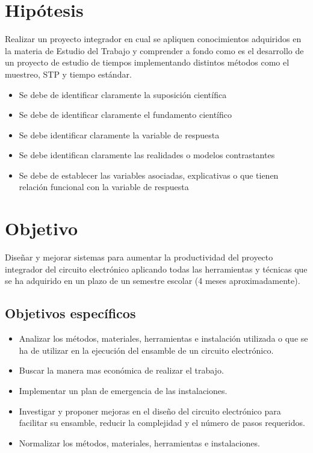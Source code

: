     
    \section{Hipótesis}
    
    Realizar un proyecto integrador en cual se apliquen conocimientos adquiridos en la materia de Estudio del Trabajo y comprender a fondo como es el desarrollo de un proyecto de estudio de tiempos implementando distintos métodos como el muestreo, STP y tiempo estándar.
    
    
    \begin{itemize}
        \item Se debe de identificar claramente la suposición científica
        \item Se debe de identificar claramente el fundamento científico
        \item Se debe identificar claramente la variable de respuesta
        \item Se debe identifican claramente las realidades o modelos contrastantes
        \item Se debe de establecer las variables asociadas, explicativas o que tienen relación funcional con la variable de respuesta
    \end{itemize}
    \section{Objetivo}
    Diseñar y mejorar sistemas para aumentar la productividad del proyecto integrador del circuito electrónico aplicando todas las herramientas y técnicas que se ha adquirido en un plazo de un semestre escolar (4 meses aproximadamente).
    
    \subsection{Objetivos específicos }
    
    \begin{itemize}
        \item Analizar los métodos, materiales, herramientas e instalación utilizada o que se ha de utilizar en la ejecución del ensamble de un circuito electrónico.
        \item Buscar la manera mas económica de realizar el trabajo.
        \item Implementar un plan de emergencia de las instalaciones.
        \item Investigar y proponer mejoras en el diseño del circuito electrónico para facilitar su ensamble, reducir la complejidad y el número de pasos requeridos.
        \item Normalizar los métodos, materiales, herramientas e instalaciones.
        
    
    \end{itemize}
    
